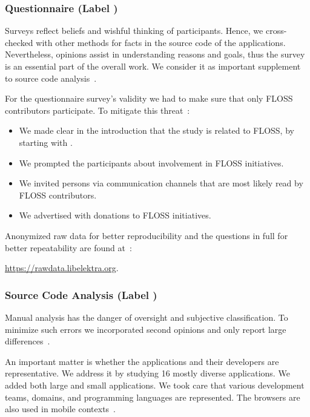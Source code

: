 \subsubsection{Questionnaire (Label \methodQuestion{})}

Surveys reflect beliefs and wishful thinking of participants.
Hence, we cross-checked with other methods for facts in the source code of the applications.
Nevertheless, opinions assist in understanding reasons and goals, thus the survey is an essential part of the overall work.
We consider it as important supplement to source code analysis~\cite{raab2017challenges}.

For the questionnaire survey's validity we had to make sure that only FLOSS contributors participate.
To mitigate this threat~\cite{raab2017challenges}:
\begin{itemize}
\item We made clear in the introduction that the study is related to FLOSS, by starting with
.
\item We prompted the participants about involvement in FLOSS initiatives.
\item We invited persons via communication channels that are most likely read by FLOSS contributors.
\item We advertised with donations to FLOSS initiatives.
\end{itemize}

Anonymized raw data for better reproducibility and the questions in full for better repeatability are found at~\cite{raab2017challenges,vitek2011repeatability,blackburn2016truth}:
\par \hspace{12em}\url{https://rawdata.libelektra.org}. \par

\subsubsection{Source Code Analysis (Label \methodSource{})}

Manual analysis has the danger of oversight and subjective classification.
To minimize such errors we incorporated second opinions and only report large differences~\cite{raab2017introducing}.

An important matter is whether the applications and their developers are representative.
We address it by studying 16 mostly diverse applications.
We added both large and small applications.
We took care that various development teams, domains, and programming languages are represented.
The browsers are also used in mobile contexts~\cite{raab2017introducing}.

